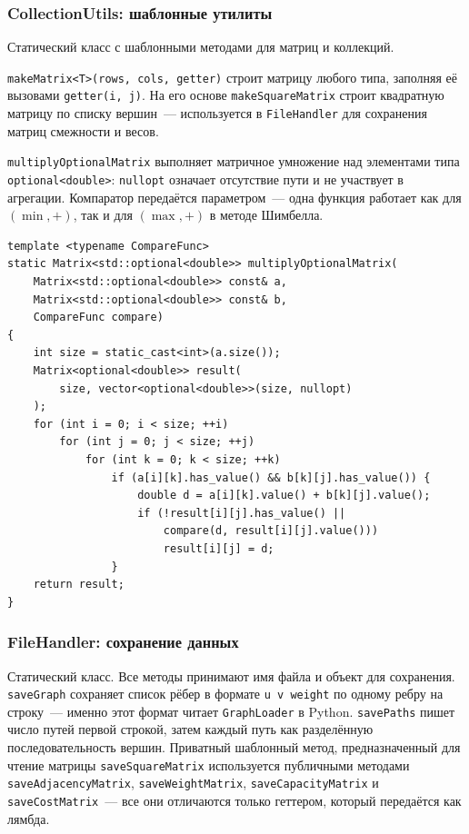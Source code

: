 \subsubsection{CollectionUtils: шаблонные утилиты}

Статический класс с шаблонными методами для матриц и коллекций.

\texttt{makeMatrix<T>(rows, cols, getter)} строит матрицу любого типа,
заполняя её вызовами \texttt{getter(i, j)}. На его основе
\texttt{makeSquareMatrix} строит квадратную матрицу по списку вершин~---
используется в \texttt{FileHandler} для сохранения матриц смежности и весов.

\texttt{multiplyOptionalMatrix} выполняет матричное умножение над элементами типа \texttt{optional<double>}: \texttt{nullopt} означает отсутствие пути
и не участвует в агрегации. Компаратор передаётся параметром~---
одна функция работает как для $(\min,+)$, так и для $(\max,+)$
в методе Шимбелла.

\begin{lstlisting}[style=cppstyle, caption={Обобщённое матричное умножение (CollectionUtils.h)}]
template <typename CompareFunc>
static Matrix<std::optional<double>> multiplyOptionalMatrix(
    Matrix<std::optional<double>> const& a,
    Matrix<std::optional<double>> const& b,
    CompareFunc compare)
{
    int size = static_cast<int>(a.size());
    Matrix<optional<double>> result(
        size, vector<optional<double>>(size, nullopt)
    );
    for (int i = 0; i < size; ++i)
        for (int j = 0; j < size; ++j)
            for (int k = 0; k < size; ++k)
                if (a[i][k].has_value() && b[k][j].has_value()) {
                    double d = a[i][k].value() + b[k][j].value();
                    if (!result[i][j].has_value() ||
                        compare(d, result[i][j].value()))
                        result[i][j] = d;
                }
    return result;
}
\end{lstlisting}

\subsubsection{FileHandler: сохранение данных}

Статический класс. Все методы принимают имя файла и объект для сохранения.
\texttt{saveGraph} сохраняет список рёбер в формате \texttt{u v weight} по
одному ребру на строку~--- именно этот формат читает \texttt{GraphLoader}
в Python. \texttt{savePaths} пишет число путей первой строкой, затем
каждый путь как разделённую последовательность вершин.
Приватный шаблонный метод, предназначенный для чтение матрицы \texttt{saveSquareMatrix} используется публичными методами
\\ \texttt{saveAdjacencyMatrix}, \texttt{saveWeightMatrix},
\texttt{saveCapacityMatrix} и \texttt{saveCostMatrix}~--- все они
отличаются только геттером, который передаётся как лямбда.

